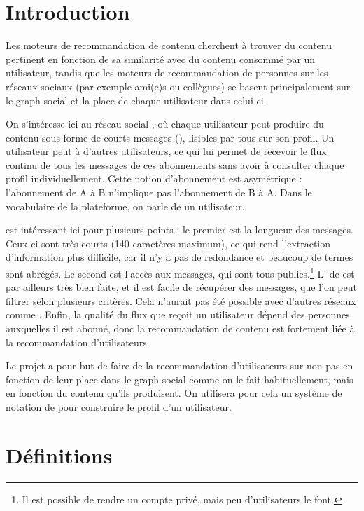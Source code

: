 
\section{Introduction}

Les moteurs de recommandation de contenu cherchent à trouver du contenu
pertinent en fonction de sa similarité avec du contenu consommé par un
utilisateur, tandis que les moteurs de recommandation de personnes sur les
réseaux sociaux (par exemple ami(e)s ou collègues) se basent principalement sur
le graph social et la place de chaque utilisateur dans celui-ci.

On s’intéresse ici au réseau social \twt{}, où chaque utilisateur peut produire
du contenu sous forme de courts messages (\tweets{}), lisibles par tous sur son
profil. Un utilisateur peut  à d’autres utilisateurs, ce qui lui
permet de recevoir le flux continu de tous les messages de ces abonnements sans
avoir à consulter chaque profil individuellement. Cette notion d’abonnement est
asymétrique : l’abonnement de A à B n’implique pas l’abonnement de B à A. Dans
le vocabulaire de la plateforme, on parle de  un utilisateur.

\twt{} est intéressant ici pour plusieurs points : le premier est la longueur
des messages. Ceux-ci sont très courts (140 caractères maximum), ce qui rend
l’extraction d’information plus difficile, car il n’y a pas de redondance et
beaucoup de termes sont abrégés. Le second est l’accès aux messages, qui sont
tous publics.\footnote{Il est possible de rendre un compte privé, mais peu
d’utilisateurs le font.} L’\api{} de \twt{} est par ailleurs très bien faite,
et il est facile de récupérer des messages, que l’on peut filtrer selon
plusieurs critères. Cela n’aurait pas été possible avec d’autres réseaux comme
\fb{}. Enfin, la qualité du flux que reçoit un utilisateur dépend des personnes
auxquelles il est abonné, donc la recommandation de contenu est fortement liée
à la recommandation d’utilisateurs.

Le projet \tb{} a pour but de faire de la recommandation d’utilisateurs sur
\twt{} non pas en fonction de leur place dans le graph social comme on le fait
habituellement, mais en fonction du contenu qu’ils produisent. On utilisera
pour cela un système de notation de \tweets{} pour construire le profil d’un
utilisateur.

\section{Définitions}

